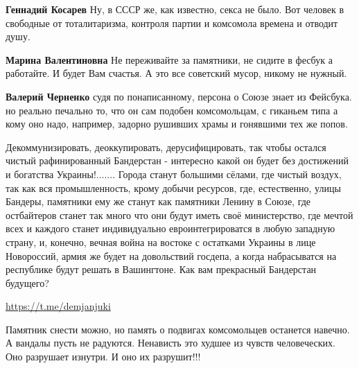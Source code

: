 \begin{itemize}
\begin{itemize}
\textbf{Геннадий Косарев} Ну, в СССР же, как известно, секса не было. Вот человек в свободные от тоталитаризма, контроля партии и комсомола времена и отводит душу.

\textbf{Марина Валентиновна} Не переживайте за памятники, не сидите в фесбук а работайте. И будет Вам счастья. А это все советский мусор, никому не нужный.

\textbf{Валерий Черненко} судя по понаписанному, персона о Союзе знает из Фейсбука. но реально печально то, что он сам подобен комсомольцам, с гиканьем типа а кому оно надо, например, задорно рушивших храмы и гонявшими тех же попов.

\end{itemize} %


Декоммунизировать, деоккупировать, дерусифицировать, так чтобы остался чистый
рафинированный Бандерстан - интересно какой он будет без достижений и богатства
Украины!....... Города станут большими сёлами, где чистый воздух, так как вся
промышленность, крому добычи ресурсов, где, естественно, улицы Бандеры,
памятники ему же станут как памятники Ленину в Союзе, где остбайтеров станет
так много что они будут иметь своё министерство, где мечтой всех и каждого
станет индивидуально евроинтегрироватся в любую западную страну, и, конечно,
вечная война на востоке с остатками Украины в лице Новороссий, армия же будет
на довольствий госдепа, а когда набрасыватся на республике будут решать в
Вашингтоне. Как вам прекрасный Бандерстан будущего? 

\url{https://t.me/demjanjuki}

\begin{itemize} %

Памятник снести можно, но память о подвигах комсомольцев останется навечно. А
вандалы пусть не радуются. Ненависть это худшее из чувств человеческих. Оно
разрушает изнутри. И оно их разрушит!!!

\end{itemize} %


\end{itemize} %
